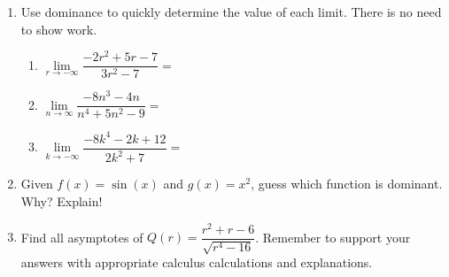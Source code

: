 \documentclass[handout,nooutcomes,noauthor]{Ximera}
\begin{document}
\begin{enumerate}[label=\arabic*]
		\item Use dominance to quickly determine the value of each limit.  There is no need to show work.
		\begin{enumerate}[label=\alph*]
			\item $ \lim\limits_{r \to -\infty} \dfrac{-2r^2+5r-7}{3r^2-7} = $ 
			\vspace{5mm}
			\item $ \lim\limits_{n \to \infty} \dfrac{-8n^3-4n}{n^4+5n^2-9} = $ 
			\vspace{5mm}
			\item $ \lim\limits_{k \to -\infty} \dfrac{-8k^4-2k+12}{2k^2+7} = $ 
			\vspace{5mm}
		\end{enumerate}
		\item Given $ f(x)=\sin(x) $ and $ g(x)=x^2 $, guess which function is dominant.  Why?  Explain!
		
		\clearpage
		
		\item Find all asymptotes of $ Q(r)=\dfrac{r^2+r-6}{\sqrt{r^4-16}} $.  Remember to support your answers with appropriate calculus calculations and explanations.
	\end{enumerate}
\end{document}
